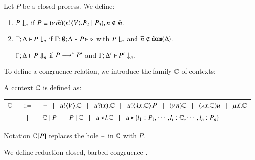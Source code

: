 \begin{definition}[Barbs]\rm
	Let $P$ be a closed process. We define:
	\begin{enumerate}
		\item	
		$P \downarrow_{n}$ if $P \equiv (\nu\, \tilde{m})(n ! \langle V \rangle . P_2 \;|\; P_3), n \notin \tilde{m}$. %

		\item	$\Gamma; \Delta \vdash P \downarrow_{n}$ if
			$\Gamma; \emptyset; \Delta \vdash P \triangleright \diamond$ with $P \downarrow_{n}$ and $\overline{n} \notin \mathtt{dom}(\Delta)$.

			$\Gamma; \Delta \vdash P \Downarrow_{n}$ if $P \longrightarrow^* P'$ and
			$\Gamma; \Delta' \vdash P' \downarrow_{n}$.			
	\end{enumerate}
\end{definition}


\noi 

To define a congruence relation, we introduce the family ${\Bbb C}$ of contexts:

\begin{definition}[Context]
	A context ${\Bbb C}$ is defined as:

	\begin{tabular}{rcl}
		${\Bbb C}$ & $\;\;::=\;\;$ & $- \;\;\;|\;\;\; u ! \langle V \rangle . {\Bbb C} \;\;\;|\;\;\; u ? (x) . {\Bbb C} \;\;\;|\;\;\; u ! \langle \lambda x.{\Bbb C} \rangle . P \;\;\;|\;\;\; (\nu\, n) {\Bbb C}
		\;\;\;|\;\;\; (\lambda x.{\Bbb C})u \;\;\;|\;\;\; \mu X. {\Bbb C}$ 
		\\
		&$\;\;\;|\;\;\;$& ${\Bbb C} \;|\; P \;\;\;|\;\;\; P \;|\; {\Bbb C}
		\;\;\;|\;\;\; u \triangleleft l . {\Bbb C} \;\;\;|\;\;\; u \triangleright \{l_1:P_1,\cdots,l_i:{\Bbb C},\cdots,l_n:P_n\}$
	\end{tabular}

\noi 
Notation ${\Bbb C}[P]$ replaces 
the hole $-$ in ${\Bbb C}$ with $P$.
\end{definition}


\noi We define reduction-closed, barbed congruence \cite{HondaKYoshida95}. 


